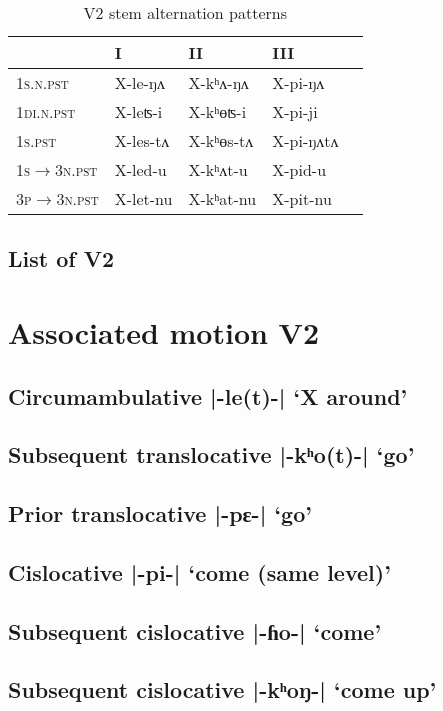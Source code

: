 \documentclass[oneside,a4paper,11pt]{article}
\newcommand{\ipa}[1]{{\phon#1}}
\newcommand{\dhatu}[2]{|\ipa{#1}| `#2'}
\begin{document}
\begin{table}[H] 
\caption{V2 stem alternation patterns} \label{tab:le.khAt.pi} \centering 
\begin{tabular}{lllll} 
\toprule 
&   I  &   II & III  \\
\midrule
\textsc{1s.n.pst} &  \ipa{X-le-ŋʌ} & \ipa{X-kʰʌ-ŋʌ} &  \ipa{X-pi-ŋʌ} \\
\textsc{1di.n.pst} &  \ipa{X-leʦ-i} & \ipa{X-kʰɵʦ-i} & \ipa{X-pi-ji} & \\
\textsc{1s.pst} & \ipa{X-les-tʌ} & \ipa{X-kʰɵs-tʌ} & \ipa{X-pi-ŋʌtʌ} & \\
\hline 
\textsc{1s$\rightarrow$3n.pst} &  \ipa{X-led-u} &  \ipa{X-kʰʌt-u} &  \ipa{X-pid-u}  \\
\textsc{3p$\rightarrow$3n.pst} &    \ipa{X-let-nu} &    \ipa{X-kʰat-nu} & \ipa{X-pit-nu} & \\
\bottomrule 
\end{tabular}
\end{table}
\subsection{List of V2}

\section{Associated motion V2}
\subsection{Circumambulative \dhatu{-le(t)-}{X around}} \label{sec:v2.le}
\subsection{Subsequent translocative \dhatu{-kʰo(t)-}{go}} \label{sec:v2.khot}
\subsection{Prior translocative \dhatu{-pɛ-}{go}} \label{sec:v2.pE}
\subsection{Cislocative \dhatu{-pi-}{come (same level)}} \label{sec:v2.pi}
\subsection{Subsequent cislocative \dhatu{-ɦo-}{come}} \label{sec:v2.ho}
\subsection{Subsequent cislocative \dhatu{-kʰoŋ-}{come up}} \label{sec:v2.khoN}
\end{document}
